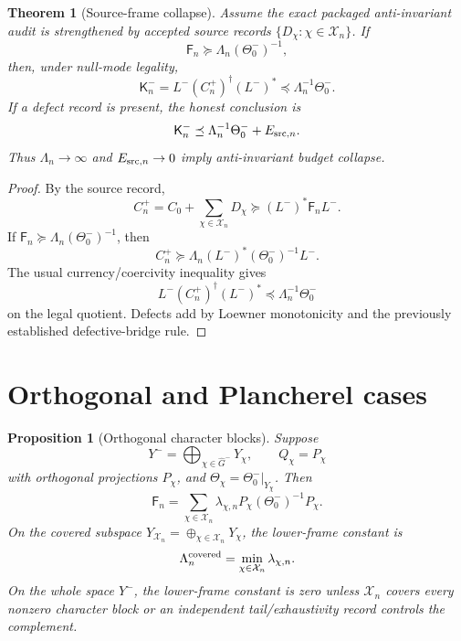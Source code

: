 \documentclass[11pt]{article}
\newtheorem{theorem}{Theorem}
\newtheorem{proposition}{Proposition}
\newcommand{\K}{\mathsf K}
\newcommand{\F}{\mathsf F}
\newcommand{\Y}{Y^-}
\newcommand{\Thetao}{\Theta^-_0}
\newcommand{\Xn}{\mathcal X_n}
\newcommand{\Hc}{\widehat G^-}
\begin{document}
\begin{theorem}[Source-frame collapse]
Assume the exact packaged anti-invariant audit is strengthened by accepted source records \(\{D_\chi:\chi\in\Xn\}\). If
\begin{equation}
  \F_n\succeq \Lambda_n(\Thetao)^{-1},
\end{equation}
then, under null-mode legality,
\begin{equation}
  \K_n^-
  =L^-(C_n^+)^\dagger(L^-)^*
  \preceq \Lambda_n^{-1}\Thetao .
\end{equation}
If a defect record is present, the honest conclusion is
\begin{equation}
  \K_n^-\preceq \Lambda_n^{-1}\Thetao + E_{{\rm src},n}.
\end{equation}
Thus \(\Lambda_n\to\infty\) and \(E_{{\rm src},n}\to0\) imply anti-invariant budget collapse.
\end{theorem}

\begin{proof}
By the source record,
\[
 C_n^+=C_0+\sum_{\chi\in\Xn}D_\chi
 \succeq
 (L^-)^*\F_n L^-.
\]
If \(\F_n\succeq \Lambda_n(\Thetao)^{-1}\), then
\[
 C_n^+\succeq \Lambda_n (L^-)^*(\Thetao)^{-1}L^- .
\]
The usual currency/coercivity inequality gives
\[
 L^-(C_n^+)^\dagger(L^-)^*\preceq \Lambda_n^{-1}\Thetao
\]
on the legal quotient.  Defects add by Loewner monotonicity and the previously established defective-bridge rule.
\end{proof}

\section{Orthogonal and Plancherel cases}

\begin{proposition}[Orthogonal character blocks]
Suppose
\[
  \Y=\bigoplus_{\chi\in\Hc}Y_\chi,
  \qquad Q_\chi=P_\chi
\]
with orthogonal projections \(P_\chi\), and \(\Theta_\chi=\Thetao|_{Y_\chi}\). Then
\begin{equation}
  \F_n=\sum_{\chi\in\Xn}\lambda_{\chi,n}P_\chi(\Thetao)^{-1}P_\chi .
\end{equation}
On the covered subspace \(Y_{\Xn}=\oplus_{\chi\in\Xn}Y_\chi\), the lower-frame constant is
\begin{equation}
  \Lambda_n^{\rm covered}=\min_{\chi\in\Xn}\lambda_{\chi,n}.
\end{equation}
On the whole space \(\Y\), the lower-frame constant is zero unless \(\Xn\) covers every nonzero character block or an independent tail/exhaustivity record controls the complement.
\end{proposition}
\end{document}
